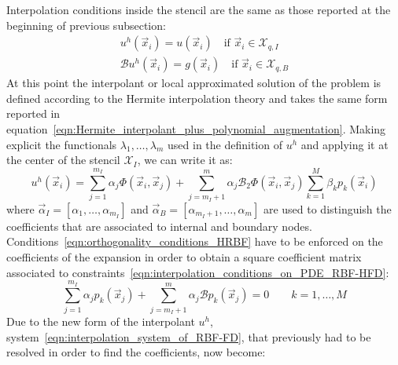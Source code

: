 Interpolation conditions inside the stencil are the same as those reported at the beginning of previous subsection:
\begin{subequations}
	\label{eqn:interpolation_conditions_on_PDE_RBF-HFD}
	\begin{gather}
		u^h(\vec{x}_i) = u(\vec{x}_i) \quad \text{if $\vec{x}_i \in \mathcal{X}_{q,I}$}  				\\
		\mathcal{B} u^h(\vec{x}_i) = g(\vec{x}_i) \quad \text{if $\vec{x}_i \in \mathcal{X}_{q,B}$}
	\end{gather}
\end{subequations}
At this point the interpolant or local approximated solution of the problem is defined according to the Hermite interpolation theory and takes the same form reported in equation~\eqref{eqn:Hermite_interpolant_plus_polynomial_augmentation}. Making explicit the functionals $\lambda_1, \dots, \lambda_m$ used in the definition of $u^h$ and applying it at the center of the stencil $\mathcal{X}_I$, we can write it as:
\begin{equation}
	\label{eqn:local_RBF-FD_interpolant}
	u^h(\vec{x}_i) = \sum_{j=1}^{m_I} \alpha_j \Phi(\vec{x}_i, \vec{x}_j) + \sum_{j=m_I+1}^{m} \alpha_j \mathcal{B}_2\Phi(\vec{x}_i, \vec{x}_j) \sum_{k=1}^{M} \beta_k p_k(\vec{x}_i)
\end{equation}
where $\vec{\alpha}_I = [\alpha_1, \dots, \alpha_{m_I}]$ and $\vec{\alpha}_B = [\alpha_{m_I+1}, \dots, \alpha_{m}]$ are used to distinguish the coefficients that are associated to internal and boundary nodes. Conditions~\eqref{eqn:orthogonality_conditions_HRBF} have to be enforced on the coefficients of the expansion in order to obtain a square coefficient matrix associated to constraints~\eqref{eqn:interpolation_conditions_on_PDE_RBF-HFD}:
\begin{equation}
	\sum_{j=1}^{m_I} \alpha_j p_k(\vec{x}_j) + \sum_{j={m_I+1}}^{m} \alpha_j \mathcal{B} p_k(\vec{x}_j)= 0 \qquad k=1, \dots, M
\end{equation}
Due to the new form of the interpolant $u^h$, system~\eqref{eqn:interpolation_system_of_RBF-FD}, that previously had to be resolved in order to find the coefficients, now become:
